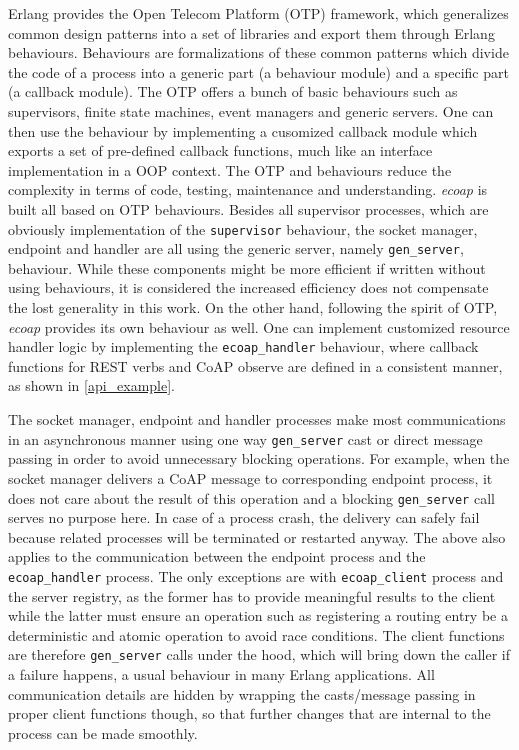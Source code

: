 Erlang provides the Open Telecom Platform (OTP) framework, which generalizes common design patterns into a set of libraries and export them through Erlang behaviours. Behaviours are formalizations of these common patterns which divide the code of a process into a generic part (a behaviour module) and a specific part (a callback module). The OTP offers a bunch of basic behaviours such as supervisors, finite state machines, event managers and generic servers. One can then use the behaviour by implementing a cusomized callback module which exports a set of pre-defined callback functions, much like an interface implementation in a OOP context. The OTP and behaviours reduce the complexity in terms of code, testing, maintenance and understanding. \textit{ecoap} is built all based on OTP behaviours. Besides all supervisor processes, which are obviously implementation of the \verb|supervisor| behaviour, the socket manager, endpoint and handler are all using the generic server, namely \verb|gen_server|, behaviour. While these components might be more efficient if written without using behaviours, it is considered the increased efficiency does not compensate the lost generality in this work. On the other hand, following the spirit of OTP, \textit{ecoap} provides its own behaviour as well. One can implement customized resource handler logic by implementing the \verb|ecoap_handler| behaviour, where callback functions for REST verbs and CoAP observe are defined in a consistent manner, as shown in \ref{api_example}.

The socket manager, endpoint and handler processes make most communications in an asynchronous manner using one way \verb|gen_server| cast or direct message passing in order to avoid unnecessary blocking operations. For example, when the socket manager delivers a CoAP message to corresponding endpoint process, it does not care about the result of this operation and a blocking \verb|gen_server| call serves no purpose here. In case of a process crash, the delivery can safely fail because related processes will be terminated or restarted anyway. The above also applies to the communication between the endpoint process and the \verb|ecoap_handler| process. The only exceptions are with \verb|ecoap_client| process and the server registry, as the former has to provide meaningful results to the client while the latter must ensure an operation such as registering a routing entry be a deterministic and atomic operation to avoid race conditions. The client functions are therefore \verb|gen_server| calls under the hood, which will bring down the caller if a failure happens, a usual behaviour in many Erlang applications. All communication details are hidden by wrapping the casts/message passing in proper client functions though, so that further changes that are internal to the process can be made smoothly. 

